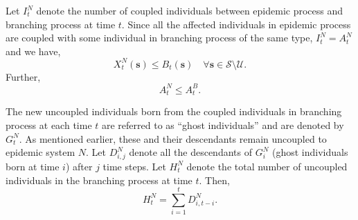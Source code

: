 \documentclass{article}
\theoremstyle{definition}
\begin{document}
Let $I_t^N$ denote the number of coupled individuals between epidemic process  and branching process at time $t$. Since all the affected individuals in epidemic process are coupled with some individual in branching process of the same type, $I_t^N = A_t^N$
and we have,
\[
X_t^N(\bm{s}) \leq B_t(\bm{s}) \quad \forall \bm{s}\in \mathcal S \setminus  \mathcal U.\]
Further,
\begin{equation}
    {A_t^N} \leq {A^B_t}.
    \label{total_affected_ineq}
    \end{equation}

The  new uncoupled  individuals  born from the coupled individuals in branching process at each time $t$ are referred to as  ``ghost individuals'' and are denoted
 by $G_t^N$. As mentioned earlier, these and their descendants  remain uncoupled to epidemic system $N$. Let $D_{i,j}^N$ denote all the descendants of $G_i^N$ (ghost individuals born at time $i$) after $j$ time steps. Let $H_t^N$ denote the
 total number of uncoupled individuals in the branching process at time $t$. Then,
\begin{equation}H_t^N=
\sum_{i=1}^t D_{i,t-i}^N.
\label{Ghost_eq}
\end{equation}

 







 
\end{document}
